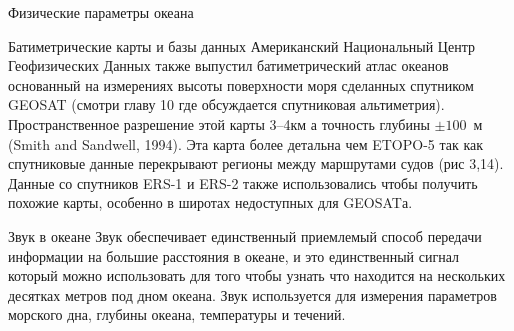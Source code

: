 \begin{chapter}{Физические параметры океана}
\begin{section}{Батиметрические карты и базы данных}
Американский Национальный Центр Геофизических Данных также выпустил
батиметрический атлас океанов основанный на измерениях высоты
поверхности моря сделанных спутником GEOSAT (смотри главу 10 где
обсуждается спутниковая альтиметрия). Пространственное разрешение этой
карты 3--4км а точность глубины $\pm 100$~м (Smith and Sandwell,
1994). Эта карта более детальна чем ETOPO-5 так как спутниковые данные
перекрывают регионы между маршрутами судов (рис 3,14). Данные со
спутников ERS-1 и ERS-2 также использовались чтобы получить похожие
карты, особенно в широтах недоступных для GEOSATа.



\end{section}

\begin{section}{Звук в океане}
Звук обеспечивает единственный приемлемый способ передачи информации
на большие расстояния в океане, и это единственный сигнал который
можно использовать для того чтобы узнать что находится на нескольких
десятках метров под дном океана. Звук используется для измерения
параметров морского дна, глубины океана, температуры и течений.
%



\end{section}
\end{chapter}
